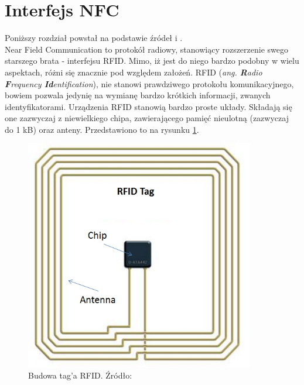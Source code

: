 \section{Interfejs NFC}
\label{NFC}

Poniższy rozdział powstał na podstawie źródeł \cite{NFC} i \cite{NFC_NXP}.\\

Near Field Communication to protokół radiowy, stanowiący rozszerzenie swego starszego brata - interfejsu RFID. Mimo, iż jest do niego bardzo podobny w wielu aspektach, różni się znacznie pod względem założeń. RFID (\textit{ang. \textbf{R}adio \textbf{F}requency \textbf{Id}entification}), nie stanowi prawdziwego protokołu komunikacyjnego, bowiem pozwala jedynię na wymianę bardzo krótkich informacji, zwanych identyfikatorami. Urządzenia RFID stanowią bardzo proste układy. Składają się one zazwyczaj z niewielkiego chipa, zawierającego pamięć nieulotną (zazwyczaj do 1 kB) oraz anteny. Przedstawiono to na rysunku \ref{fig:image_rfid_tag}.

\begin{figure}[H]
	\centering
	\includegraphics[width=10cm]{img/theory/NFC/RFID_tag.jpg}
	\caption{Budowa tag'a RFID. Źródło: \cite{RFID_antenna}}
	\label{fig:image_rfid_tag}
\end{figure}

